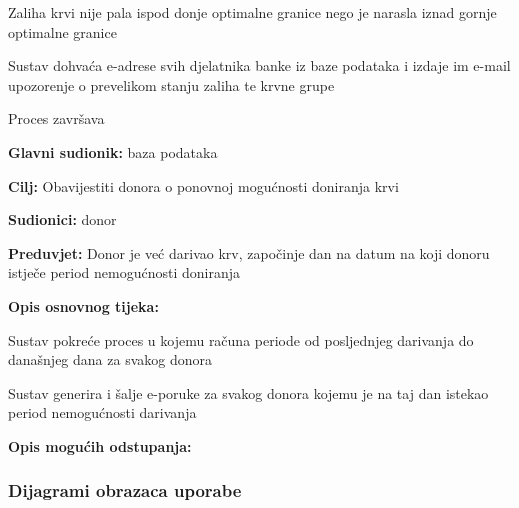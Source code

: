 \begin{packed_item}
\begin{packed_item}
							\item[] Zaliha krvi nije pala ispod donje optimalne granice nego je narasla iznad gornje optimalne granice
							\item[] \begin{packed_enum} 
    	                        \item Sustav dohvaća e-adrese svih djelatnika banke iz baze podataka i izdaje im e-mail upozorenje o prevelikom stanju zaliha te krvne grupe 
    	                        \item Proces završava
							\end{packed_enum}

						\end{packed_item}
						
					\end{packed_item}
					
					
					\noindent {}
					\begin{packed_item}
	
						\item \textbf{Glavni sudionik: }baza podataka
						\item  \textbf{Cilj:} Obavijestiti donora o ponovnoj mogućnosti doniranja krvi
						\item  \textbf{Sudionici:} donor
						\item  \textbf{Preduvjet:} Donor je već darivao krv, započinje dan na datum na koji donoru istječe period nemogućnosti doniranja
						\item  \textbf{Opis osnovnog tijeka:}
						
						\item[] \begin{packed_enum}
							\item Sustav pokreće proces u kojemu računa periode od posljednjeg darivanja do današnjeg dana za svakog donora
	                        \item Sustav generira i šalje e-poruke za svakog donora kojemu je na taj dan istekao period nemogućnosti darivanja
						\end{packed_enum}
						
						\item  \textbf{Opis mogućih odstupanja:}
						
					\end{packed_item}
					
				\subsubsection{Dijagrami obrazaca uporabe}
					
